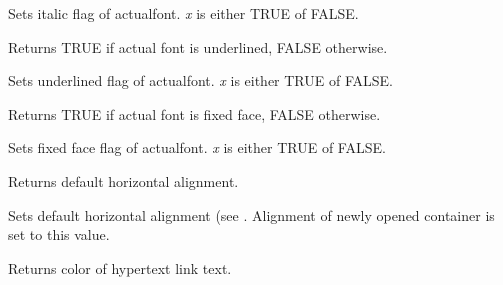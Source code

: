 
Sets italic flag of actualfont. {\it x} is either TRUE of FALSE.

\label{wxhtmlwinparsergetfontunderlined}


Returns TRUE if actual font is underlined, FALSE otherwise.

\label{wxhtmlwinparsersetfontunderlined}


Sets underlined flag of actualfont. {\it x} is either TRUE of FALSE.

\label{wxhtmlwinparsergetfontfixed}


Returns TRUE if actual font is fixed face, FALSE otherwise.

\label{wxhtmlwinparsersetfontfixed}


Sets fixed face flag of actualfont. {\it x} is either TRUE of FALSE.

\label{wxhtmlwinparsergetalign}


Returns default horizontal alignment.

\label{wxhtmlwinparsersetalign}


Sets default horizontal alignment (see .
Alignment of newly opened container is set to this value.

\label{wxhtmlwinparsergetlinkcolor}


Returns color of hypertext link text.

\label{wxhtmlwinparsersetlinkcolor}


